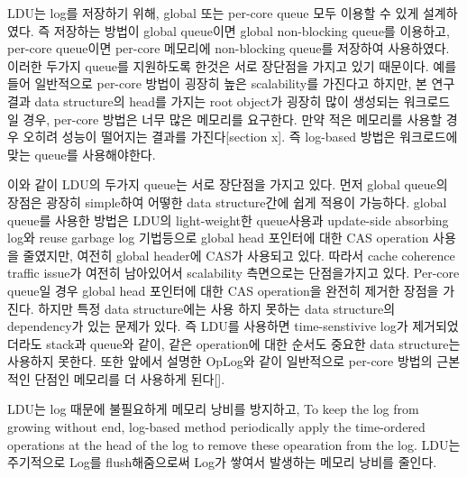 \ifkor
LDU는 log를 저장하기 위해, global 또는 per-core queue 모두 이용할 수 있게 설계하였다.
즉 저장하는 방법이 global queue이면 global non-blocking queue를 이용하고, per-core queue이면
per-core 메모리에 non-blocking queue를 저장하여 사용하였다. 
이러한 두가지 queue를 지원하도록 한것은 서로 장단점을 가지고 있기 때문이다.
예를 들어 일반적으로 per-core 방법이 굉장히 높은 scalability를 가진다고 하지만, 본 연구 결과 data
structure의 head를 가지는 root object가 굉장히 많이 생성되는 워크로드일 경우,
per-core 방법은 너무 많은 메모리를 요구한다.
만약 적은 메모리를 사용할 경우 오히려 성능이 떨어지는 결과를 가진다[section x].
즉 log-based 방법은 워크로드에 맞는 queue를 사용해야한다. 

이와 같이 LDU의 두가지 queue는 서로 장단점을 가지고 있다. 
먼저 global queue의 장점은 광장히 simple하여 어떻한 data structure간에 쉽게 적용이 가능하다.
global queue를 사용한 방법은 LDU의 light-weight한 queue사용과 update-side absorbing log와
reuse garbage log 기법등으로 global head 포인터에 대한 CAS operation 사용을 줄였지만, 여전히 global
header에 CAS가 사용되고 있다. 
따라서 cache coherence traffic issue가 여전히 남아있어서 scalability 측면으로는 단점을가지고 있다.
Per-core queue일 경우 global head 포인터에 대한 CAS operation을 완전히 제거한 장점을 가진다.
하지만 특정 data structure에는 사용 하지 못하는 data structure의 dependency가 있는 문제가 있다.
즉 LDU를 사용하면 time-senstivive log가 제거되었더라도 stack과 queue와 같이, 같은 operation에 대한 순서도
중요한 data structure는 사용하지 못한다.
또한 앞에서 설명한 OpLog와 같이 일반적으로 per-core 방법의 근본적인 단점인 메모리를 더 사용하게 된다[].  
\else

\fi



\ifkor
LDU는 log 때문에 불필요하게 메모리 낭비를 방지하고, To keep the log from growing without end,
log-based method periodically apply the time-ordered operations at the head of
the log to remove these opearation from the log.
LDU는 주기적으로 Log를 flush해줌으로써 Log가 쌓여서 발생하는 메모리 낭비를 줄인다.
\else
\fi


